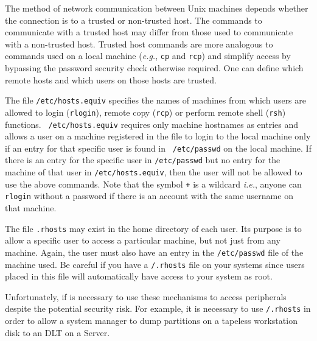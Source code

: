 \documentclass[11pt]{article}
\begin{document}
The method of network communication between Unix machines depends
whether the connection is to a trusted or non-trusted host. The
commands to communicate with a trusted host may differ from those used
to communicate with a non-trusted host. Trusted host commands are more
analogous to commands used on a local machine (\emph{e.g.}, {\tt cp} and
{\tt rcp}) and simplify access by bypassing the password security check
otherwise required.  One can define which remote hosts and which users
on those hosts are trusted.

The file {\tt /etc/hosts.equiv} specifies the names of machines from
which users are allowed to login (\verb+rlogin+), remote copy
(\verb+rcp+) or perform remote shell (\verb+rsh+) functions. {\tt
/etc/hosts.equiv} requires only machine hostnames as entries and allows
a user on a machine registered in the file to login to the local
machine only if an entry for that specific user is found in {\tt
/etc/passwd} on the local machine. If there is an entry for the
specific user in {\tt /etc/passwd} but no entry for the machine of that
user in {\tt /etc/hosts.equiv}, then the user will not be allowed to
use the above commands.  Note that the symbol {\tt +} is a wildcard
\emph{i.e.}, anyone can {\tt rlogin} without a password if there is an
account with the same username on that machine.

The file {\tt .rhosts} may exist in the home directory
of each user. Its purpose is to allow a specific user to access a
particular machine, but not just from any machine. Again, the user must
also have an entry in the {\tt /etc/passwd} file of the machine used.
Be careful if you have a {\tt /.rhosts} file on your systems since users
placed in this file will automatically have access to your system as
root.

Unfortunately, if is necessary to use these mechanisms to access
peripherals despite the potential security risk. For example, it is
necessary to use {\tt /.rhosts} in order to allow a system manager to
dump partitions on a tapeless workstation disk to an DLT on a Server.
\end{document}

